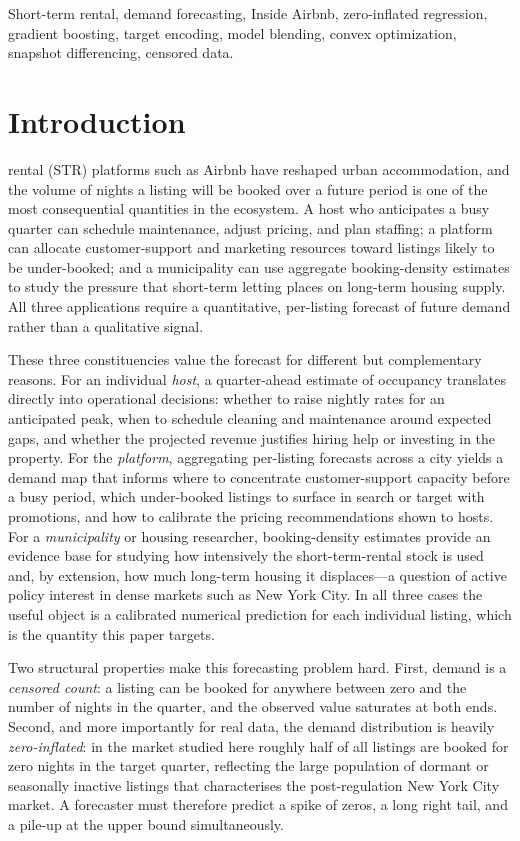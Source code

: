 \documentclass[journal]{IEEEtran}
\begin{document}
\begin{IEEEkeywords}
Short-term rental, demand forecasting, Inside Airbnb, zero-inflated regression,
gradient boosting, target encoding, model blending, convex optimization,
snapshot differencing, censored data.
\end{IEEEkeywords}

\section{Introduction}
 rental (STR) platforms such as Airbnb have reshaped
urban accommodation, and the volume of nights a listing will be booked over a
future period is one of the most consequential quantities in the ecosystem. A
host who anticipates a busy quarter can schedule maintenance, adjust pricing, and
plan staffing; a platform can allocate customer-support and marketing resources
toward listings likely to be under-booked; and a municipality can use aggregate
booking-density estimates to study the pressure that short-term letting places on
long-term housing supply. All three applications require a quantitative,
per-listing forecast of future demand rather than a qualitative signal.

These three constituencies value the forecast for different but complementary
reasons. For an individual \emph{host}, a quarter-ahead estimate of occupancy
translates directly into operational decisions: whether to raise nightly rates for
an anticipated peak, when to schedule cleaning and maintenance around expected
gaps, and whether the projected revenue justifies hiring help or investing in the
property. For the \emph{platform}, aggregating per-listing forecasts across a city
yields a demand map that informs where to concentrate customer-support capacity
before a busy period, which under-booked listings to surface in search or target
with promotions, and how to calibrate the pricing recommendations shown to hosts.
For a \emph{municipality} or housing researcher, booking-density estimates provide
an evidence base for studying how intensively the short-term-rental stock is used
and, by extension, how much long-term housing it displaces---a question of active
policy interest in dense markets such as New York City. In all three cases the
useful object is a calibrated numerical prediction for each individual listing,
which is the quantity this paper targets.

Two structural properties make this forecasting problem hard. First, demand is a
\emph{censored count}: a listing can be booked for anywhere between zero and the
number of nights in the quarter, and the observed value saturates at both ends.
Second, and more importantly for real data, the demand distribution is heavily
\emph{zero-inflated}: in the market studied here roughly half of all listings are
booked for zero nights in the target quarter, reflecting the large population of
dormant or seasonally inactive listings that characterises the post-regulation New
York City market. A forecaster must therefore predict a spike of zeros, a long
right tail, and a pile-up at the upper bound simultaneously.
\end{document}
